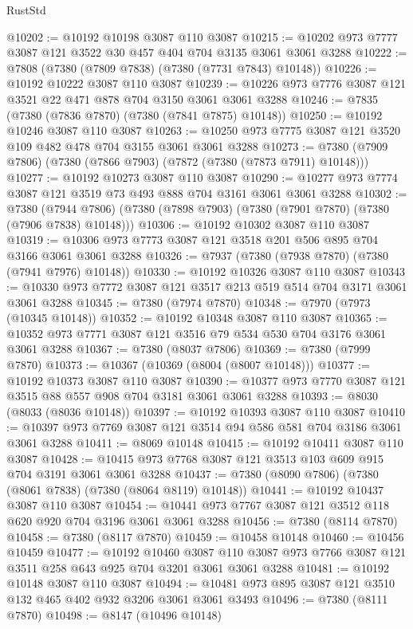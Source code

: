\begin{lexlean}{RustStd}
\begin{coremodule}
@10202 := @10192 @10198 @3087 @110 @3087
@10215 := @10202 @973 @7777 @3087 @121 @3522 @30 @457 @404 @704 @3135 @3061 @3061 @3288
@10222 := @7808 (@7380 (@7809 @7838) (@7380 (@7731 @7843) @10148))
@10226 := @10192 @10222 @3087 @110 @3087
@10239 := @10226 @973 @7776 @3087 @121 @3521 @22 @471 @878 @704 @3150 @3061 @3061 @3288
@10246 := @7835 (@7380 (@7836 @7870) (@7380 (@7841 @7875) @10148))
@10250 := @10192 @10246 @3087 @110 @3087
@10263 := @10250 @973 @7775 @3087 @121 @3520 @109 @482 @478 @704 @3155 @3061 @3061 @3288
@10273 := @7380 (@7909 @7806) (@7380 (@7866 @7903) (@7872 (@7380 (@7873 @7911) @10148)))
@10277 := @10192 @10273 @3087 @110 @3087
@10290 := @10277 @973 @7774 @3087 @121 @3519 @73 @493 @888 @704 @3161 @3061 @3061 @3288
@10302 := @7380
    (@7944 @7806)
    (@7380 (@7898 @7903) (@7380 (@7901 @7870) (@7380 (@7906 @7838) @10148)))
@10306 := @10192 @10302 @3087 @110 @3087
@10319 := @10306 @973 @7773 @3087 @121 @3518 @201 @506 @895 @704 @3166 @3061 @3061 @3288
@10326 := @7937 (@7380 (@7938 @7870) (@7380 (@7941 @7976) @10148))
@10330 := @10192 @10326 @3087 @110 @3087
@10343 := @10330 @973 @7772 @3087 @121 @3517 @213 @519 @514 @704 @3171 @3061 @3061 @3288
@10345 := @7380 (@7974 @7870)
@10348 := @7970 (@7973 (@10345 @10148))
@10352 := @10192 @10348 @3087 @110 @3087
@10365 := @10352 @973 @7771 @3087 @121 @3516 @79 @534 @530 @704 @3176 @3061 @3061 @3288
@10367 := @7380 (@8037 @7806)
@10369 := @7380 (@7999 @7870)
@10373 := @10367 (@10369 (@8004 (@8007 @10148)))
@10377 := @10192 @10373 @3087 @110 @3087
@10390 := @10377 @973 @7770 @3087 @121 @3515 @88 @557 @908 @704 @3181 @3061 @3061 @3288
@10393 := @8030 (@8033 (@8036 @10148))
@10397 := @10192 @10393 @3087 @110 @3087
@10410 := @10397 @973 @7769 @3087 @121 @3514 @94 @586 @581 @704 @3186 @3061 @3061 @3288
@10411 := @8069 @10148
@10415 := @10192 @10411 @3087 @110 @3087
@10428 := @10415 @973 @7768 @3087 @121 @3513 @103 @609 @915 @704 @3191 @3061 @3061 @3288
@10437 := @7380 (@8090 @7806) (@7380 (@8061 @7838) (@7380 (@8064 @8119) @10148))
@10441 := @10192 @10437 @3087 @110 @3087
@10454 := @10441 @973 @7767 @3087 @121 @3512 @118 @620 @920 @704 @3196 @3061 @3061 @3288
@10456 := @7380 (@8114 @7870)
@10458 := @7380 (@8117 @7870)
@10459 := @10458 @10148
@10460 := @10456 @10459
@10477 := @10192
    @10460
    @3087
    @110
    @3087
    @973
    @7766
    @3087
    @121
    @3511
    @258
    @643
    @925
    @704
    @3201
    @3061
    @3061
    @3288
@10481 := @10192 @10148 @3087 @110 @3087
@10494 := @10481 @973 @895 @3087 @121 @3510 @132 @465 @402 @932 @3206 @3061 @3061 @3493
@10496 := @7380 (@8111 @7870)
@10498 := @8147 (@10496 @10148)

\end{coremodule}
\end{lexlean}
